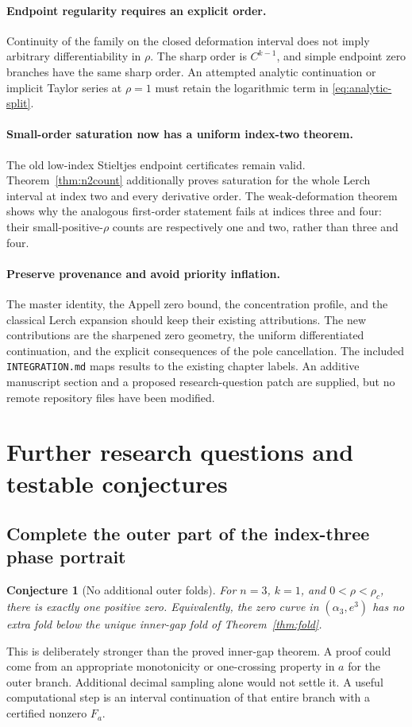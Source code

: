 \documentclass[11pt,letterpaper]{article}
\numberwithin{equation}{section}
\newtheorem{conjecture}[theorem]{Conjecture}
\theoremstyle{definition}\newtheorem{definition}[theorem]{Definition}
\theoremstyle{remark}\newtheorem{remark}[theorem]{Remark}
\newcommand{\src}[1]{\nolinkurl{#1}}
\begin{document}
\paragraph{Endpoint regularity requires an explicit order.}
Continuity of the family on the closed deformation interval does not imply arbitrary differentiability in $\rho$. The sharp order is $C^{k-1}$, and simple endpoint zero branches have the same sharp order. An attempted analytic continuation or implicit Taylor series at $\rho=1$ must retain the logarithmic term in \eqref{eq:analytic-split}.

\paragraph{Small-order saturation now has a uniform index-two theorem.}
The old low-index Stieltjes endpoint certificates remain valid. Theorem~\ref{thm:n2count} additionally proves saturation for the whole Lerch interval at index two and every derivative order. The weak-deformation theorem shows why the analogous first-order statement fails at indices three and four: their small-positive-$\rho$ counts are respectively one and two, rather than three and four.

\paragraph{Preserve provenance and avoid priority inflation.}
The master identity, the Appell zero bound, the concentration profile, and the classical Lerch expansion should keep their existing attributions. The new contributions are the sharpened zero geometry, the uniform differentiated continuation, and the explicit consequences of the pole cancellation. The included \src{INTEGRATION.md} maps results to the existing chapter labels. An additive manuscript section and a proposed research-question patch are supplied, but no remote repository files have been modified.

\section{Further research questions and testable conjectures}\label{sec:questions}
\subsection{Complete the outer part of the index-three phase portrait}
\begin{conjecture}[No additional outer folds]\label{conj:outer}
For $n=3$, $k=1$, and $0<\rho<\rho_c$, there is exactly one positive zero. Equivalently, the zero curve in $(\alpha_3,e^3)$ has no extra fold below the unique inner-gap fold of Theorem~\ref{thm:fold}.
\end{conjecture}
This is deliberately stronger than the proved inner-gap theorem. A proof could come from an appropriate monotonicity or one-crossing property in $a$ for the outer branch. Additional decimal sampling alone would not settle it. A useful computational step is an interval continuation of that entire branch with a certified nonzero $F_a$.
\end{document}
